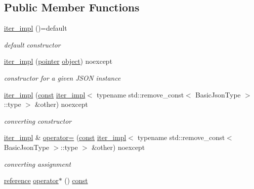 \subsection*{Public Member Functions}
\begin{DoxyCompactItemize}
\item 
\hyperlink{classnlohmann_1_1detail_1_1iter__impl_a19aa457f9c4af1b7e3af59839132cc5c}{iter\+\_\+impl} ()=default
\begin{DoxyCompactList}\small\item\em default constructor \end{DoxyCompactList}\item 
\hyperlink{classnlohmann_1_1detail_1_1iter__impl_a88a00484ac201c52fc5f613d88a2918b}{iter\+\_\+impl} (\hyperlink{classnlohmann_1_1detail_1_1iter__impl_a69e52f890ce8c556fd68ce109e24b360}{pointer} \hyperlink{namespacenlohmann_1_1detail_a1ed8fc6239da25abcaf681d30ace4985aa8cfde6331bd59eb2ac96f8911c4b666}{object}) noexcept
\begin{DoxyCompactList}\small\item\em constructor for a given J\+S\+ON instance \end{DoxyCompactList}\item 
\hyperlink{classnlohmann_1_1detail_1_1iter__impl_a867f7eb55091be31b013adb3e46816d3}{iter\+\_\+impl} (\hyperlink{functions__c_8js_afacfd9c985d225bb07483b887a801b6f}{const} \hyperlink{classnlohmann_1_1detail_1_1iter__impl}{iter\+\_\+impl}$<$ typename std\+::remove\+\_\+const$<$ Basic\+Json\+Type $>$\+::type $>$ \&other) noexcept
\begin{DoxyCompactList}\small\item\em converting constructor \end{DoxyCompactList}\item 
\hyperlink{classnlohmann_1_1detail_1_1iter__impl}{iter\+\_\+impl} \& \hyperlink{classnlohmann_1_1detail_1_1iter__impl_a7159ed1cfe7c423a2baef8bea0c94509}{operator=} (\hyperlink{functions__c_8js_afacfd9c985d225bb07483b887a801b6f}{const} \hyperlink{classnlohmann_1_1detail_1_1iter__impl}{iter\+\_\+impl}$<$ typename std\+::remove\+\_\+const$<$ Basic\+Json\+Type $>$\+::type $>$ \&other) noexcept
\begin{DoxyCompactList}\small\item\em converting assignment \end{DoxyCompactList}\item 
\hyperlink{classnlohmann_1_1detail_1_1iter__impl_a5be8001be099c6b82310f4d387b953ce}{reference} \hyperlink{classnlohmann_1_1detail_1_1iter__impl_adafa65198cad0cc7295d21cfa7678e6e}{operator$\ast$} () \hyperlink{functions__c_8js_afacfd9c985d225bb07483b887a801b6f}{const} 

\end{DoxyCompactItemize}
